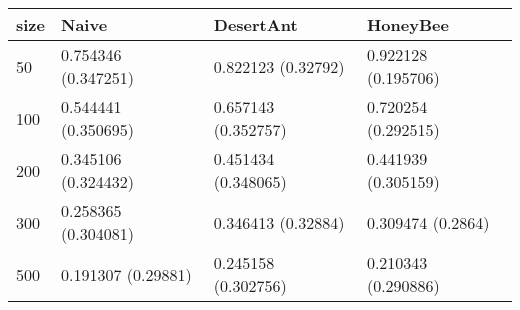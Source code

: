 \begin{tabular} {|l|l|l|l|}
\hline
size & Naive & DesertAnt & HoneyBee \\
\hline
50 & 0.754346 (0.347251)  & 0.822123 (0.32792)  & 0.922128 (0.195706)  \\
100 & 0.544441 (0.350695)  & 0.657143 (0.352757)  & 0.720254 (0.292515)  \\
200 & 0.345106 (0.324432)  & 0.451434 (0.348065)  & 0.441939 (0.305159)  \\
300 & 0.258365 (0.304081)  & 0.346413 (0.32884)  & 0.309474 (0.2864)  \\
500 & 0.191307 (0.29881)  & 0.245158 (0.302756)  & 0.210343 (0.290886)  \\
\hline
\end{tabular}
